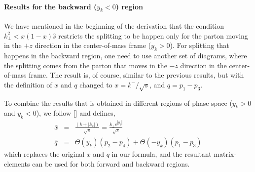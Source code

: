 \paragraph*{Results for the backward ($y_k < 0$) region}
We have mentioned in the beginning of the derivation that the condition $k_\perp^2 < x(1-x)\hat{s}$ restricts the splitting to be happen only for the parton moving in the $+z$ direction in the center-of-mass frame ($y_k > 0$).
For splitting that happens in the backward region, one need to use another set of diagrams, where the splitting comes from the parton that moves in the $-z$ direction in the center-of-mass frame. 
The result is, of course, similar to the previous results, but with the definition of $x$ and $q$ changed to $x = k^-/\sqrt{s}$, and $q = p_1-p_3$.

To combine the results that is obtained in different regions of phase space ($y_k > 0$ and $y_k < 0$), we follow [] and defines,
\begin{eqnarray}
\bar{x} &=& \frac{(k + |k_z|)}{\sqrt{s}} = \frac{k_\perp e^{|y_k|}}{\sqrt{s}}\\ 
\bar{q} &=& \Theta(y_k)(p_2-p_4) + \Theta(-y_k)(p_1-p_3)
\end{eqnarray}
which replaces the original $x$ and $q$ in our formula, and the resultant matrix-elements can be used for both forward and backward regions.

